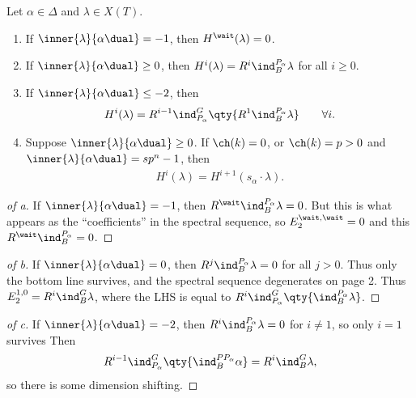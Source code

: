 \begin{proposition}[?]

Let \(\alpha\in\Delta\) and \(\lambda \in X(T)\).

\begin{enumerate}
\def\labelenumi{\arabic{enumi}.}
\item
  If \(\inner{\lambda}{\alpha\dual} = -1\), then
  \(H^\wait(\lambda) = 0\).
\item
  If \(\inner{\lambda}{ \alpha\dual} \geq 0\), then
  \(H^i(\lambda) = R^i \ind_B^{P_\alpha} \lambda\) for all \(i\geq 0\).
\item
  If \(\inner{\lambda}{\alpha\dual} \leq -2\), then
  \begin{align*}  
  H^i(\lambda) = R^{i-1} \ind_{P_\alpha}^G \qty{ R^1 \ind_B^{P_\alpha} \lambda } \qquad \forall i
  .\end{align*}
\item
  Suppose \(\inner{\lambda}{\alpha\dual} \geq 0\). If \(\ch(k) = 0\), or
  \(\ch(k) = p> 0\) and \(\inner{\lambda}{\alpha\dual} = sp^n - 1\),
  then
  \begin{align*}  
    H^i(\lambda) = H^{i+1}(s_\alpha\cdot \lambda)
    .\end{align*}
\end{enumerate}

\end{proposition}

\begin{proof}[of a]

If \(\inner{\lambda}{\alpha\dual} = -1\), then
\(R^\wait \ind_B^{P_\alpha} \lambda = 0\). But this is what appears as
the ``coefficients'' in the spectral sequence, so
\(E_2^{\wait, \wait} = 0\) and this \(R^\wait \ind_B^{P_\alpha} = 0\).

\end{proof}

\begin{proof}[of b]

If \(\inner{\lambda}{\alpha\dual} = 0\), then
\(R^j \ind_B^{P_\alpha} \lambda = 0\) for all \(j>0\). Thus only the
bottom line survives, and the spectral sequence degenerates on page 2.
Thus \(E_2^{1, 0} = R^i \ind_B^G \lambda\), where the LHS is equal to
\(R^i \ind_{P_\alpha}^G \qty{\ind_B^{P_\alpha} \lambda }\).

\end{proof}

\begin{proof}[of c]

If \(\inner{\lambda}{\alpha\dual} = -2\), then
\(R^i \ind_B^{P_\alpha} \lambda = 0\) for \(i\neq 1\), so only \(i=1\)
survives Then
\begin{align*}
R^{i-1} \ind_{P_\alpha}^G \qty{ \ind_B^{PP_\alpha} \alpha} = R^i \ind_B^G \lambda
,\end{align*} so there is some dimension shifting.

\end{proof}

